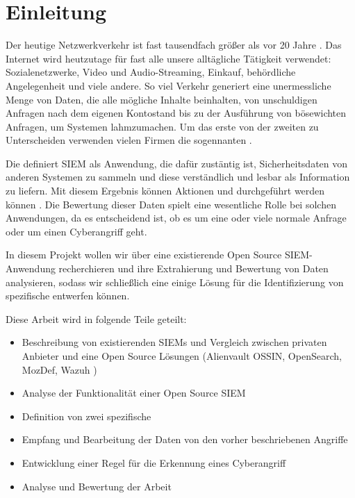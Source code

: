 \section{Einleitung}

Der heutige Netzwerkverkehr ist fast tausendfach größer als vor 20 Jahre \citep{Roser_I}. Das Internet wird heutzutage für fast alle unsere alltägliche Tätigkeit verwendet:  Sozialenetzwerke, Video und Audio-Streaming, Einkauf, behördliche Angelegenheit und viele andere. So viel Verkehr generiert eine unermessliche Menge von Daten, die alle mögliche Inhalte beinhalten, von unschuldigen Anfragen nach dem eigenen Kontostand bis zu der Ausführung von bösewichten Anfragen, um Systemen lahmzumachen. Um das erste von der zweiten zu Unterscheiden verwenden vielen Firmen die sogennanten .

Die  definiert \acrshort{SIEM} als Anwendung, die dafür zustäntig ist, Sicherheitsdaten von anderen Systemen zu sammeln und diese verständlich und lesbar als Information zu liefern. Mit diesem Ergebnis können Aktionen und durchgeführt werden können \citep{NIST_SIEM}. Die Bewertung dieser Daten spielt eine wesentliche Rolle bei solchen Anwendungen, da es entscheidend ist, ob es um eine oder viele normale Anfrage oder um einen \gls{Cyberangriff} geht.

In diesem Projekt wollen wir über eine existierende \gls{Open Source} \gls{SIEM}-Anwendung recherchieren und ihre Extrahierung und Bewertung von Daten analysieren, sodass wir schließlich eine einige Lösung für die Identifizierung von spezifische  entwerfen können.

Diese Arbeit wird in folgende Teile geteilt:

\begin{itemize}[noitemsep]
   \item Beschreibung von existierenden \glspl{SIEM} und Vergleich zwischen privaten Anbieter und eine \gls{Open Source} Lösungen (Alienvault OSSIN, OpenSearch, MozDef, Wazuh )
   \item Analyse der Funktionalität einer \gls{Open Source} \gls{SIEM}
   \item Definition von zwei spezifische 
   \item Empfang und Bearbeitung der Daten von den vorher beschriebenen Angriffe
   \item Entwicklung einer Regel für die Erkennung eines \gls{Cyberangriff}
   \item Analyse und Bewertung der Arbeit
\end{itemize}

